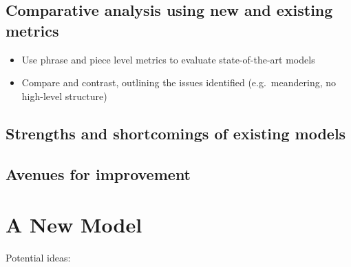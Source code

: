 \documentclass[12pt,a4paper,]{report}
\providecommand{\tightlist}{%
  \setlength{\itemsep}{0pt}\setlength{\parskip}{0pt}}
\begin{document}
\hypertarget{comparative-analysis-using-new-and-existing-metrics}{%
\section{Comparative analysis using new and existing
metrics}\label{comparative-analysis-using-new-and-existing-metrics}}

\begin{itemize}
\tightlist
\item
  Use phrase and piece level metrics to evaluate state-of-the-art models
\item
  Compare and contrast, outlining the issues identified
  (e.g.~meandering, no high-level structure)
\end{itemize}

\hypertarget{strengths-and-shortcomings-of-existing-models}{%
\section{Strengths and shortcomings of existing
models}\label{strengths-and-shortcomings-of-existing-models}}

\hypertarget{avenues-for-improvement}{%
\section{Avenues for improvement}\label{avenues-for-improvement}}

\hypertarget{a-new-model}{%
\chapter{A New Model}\label{a-new-model}}

Potential ideas:
\end{document}
